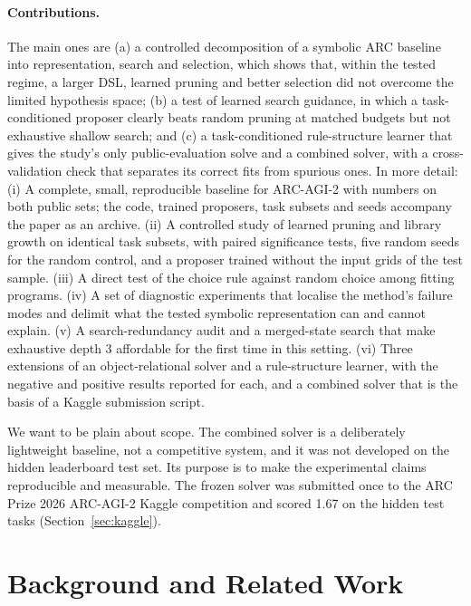 \documentclass[sigconf,nonacm]{acmart}
\begin{document}
\paragraph{Contributions.} The main ones are (a) a controlled decomposition of a symbolic ARC baseline into representation, search and selection, which shows that, within the tested regime, a larger DSL, learned pruning and better selection did not overcome the limited hypothesis space; (b) a test of learned search guidance, in which a task-conditioned proposer clearly beats random pruning at matched budgets but not exhaustive shallow search; and (c) a task-conditioned rule-structure learner that gives the study's only public-evaluation solve and a combined solver, with a cross-validation check that separates its correct fits from spurious ones. In more detail: (i) A complete, small, reproducible baseline for ARC-AGI-2 with numbers on both public sets; the code, trained proposers, task subsets and seeds accompany the paper as an archive. (ii) A controlled study of learned pruning and library growth on identical task subsets, with paired significance tests, five random seeds for the random control, and a proposer trained without the input grids of the test sample. (iii) A direct test of the choice rule against random choice among fitting programs. (iv) A set of diagnostic experiments that localise the method's failure modes and delimit what the tested symbolic representation can and cannot explain. (v) A search-redundancy audit and a merged-state search that make exhaustive depth 3 affordable for the first time in this setting. (vi) Three extensions of an object-relational solver and a rule-structure learner, with the negative and positive results reported for each, and a combined solver that is the basis of a Kaggle submission script.

We want to be plain about scope. The combined solver is a deliberately lightweight baseline, not a competitive system, and it was not developed on the hidden leaderboard test set. Its purpose is to make the experimental claims reproducible and measurable. The frozen solver was submitted once to the ARC Prize 2026 ARC-AGI-2 Kaggle competition and scored 1.67 on the hidden test tasks (Section~\ref{sec:kaggle}).

\section{Background and Related Work}
\end{document}
